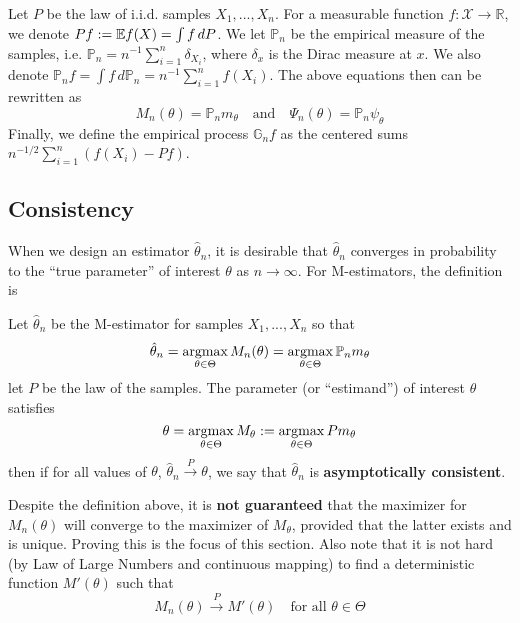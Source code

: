 \documentclass{article}
\begin{document}
Let $P$ be the law of i.i.d. samples $X_1, ..., X_n$. For a measurable function $f: \mathcal{X} \to \mathbb{R}$, we denote $Pf := \mathbb{E} f(X) = \int f\, dP$. We let $\mathbb{P}_n$ be the empirical measure of the samples, i.e. $\mathbb{P}_n = n^{-1} \sum_{i=1}^{n} \delta_{X_i}$, where $\delta_x$ is the Dirac measure at $x$. We also denote $\mathbb{P}_n f = \int f\, d\mathbb{P}_n = n^{-1} \sum_{i=1}^{n} f(X_i)$. The above equations then can be rewritten as 
\begin{equation}
    M_n(\theta) = \mathbb{P}_n m_\theta \quad \text{and} \quad \Psi_n(\theta) = \mathbb{P}_n \psi_\theta
\end{equation}
Finally, we define the empirical process $\mathbb{G}_n f$ as the centered sums $n^{-1/2} \sum_{i=1}^n \left( f(X_i) - Pf \right)$.

\subsection{Consistency}
When we design an estimator $\hat \theta_n$, it is desirable that $\hat \theta_n$ converges in probability to the ``true parameter'' of interest $\theta$ as $n \to \infty$. For M-estimators, the definition is
\begin{definition}
    Let $\hat \theta_n$ be the M-estimator for samples $X_1, ..., X_n$ so that 
    \begin{equation}
        \hat \theta_n = \mathop{\mathrm{argmax}}_{\theta \in \Theta} M_n(\theta) = \mathop{\mathrm{argmax}}_{\theta \in \Theta} \mathbb{P}_n m_\theta
    \end{equation}
    let $P$ be the law of the samples. The parameter (or ``estimand'') of interest $\theta$ satisfies
    \begin{equation}
        \theta = \mathop{\mathrm{argmax}}_{\theta \in \Theta} M_\theta := \mathop{\mathrm{argmax}}_{\theta \in \Theta} P m_\theta
    \end{equation}
    then if for all values of $\theta$, $\hat \theta_n \xrightarrow{P} \theta$, we say that $\hat \theta_n$ is \textbf{asymptotically consistent}.
\end{definition} 
Despite the definition above, it is \textbf{not guaranteed} that the maximizer for $M_n(\theta)$ will converge to the maximizer of $M_\theta$, provided that the latter exists and is unique. Proving this is the focus of this section. Also note that it is not hard (by Law of Large Numbers and continuous mapping) to find a deterministic function $M'(\theta)$ such that
\begin{equation}
    M_n(\theta) \xrightarrow{P} M'(\theta) \quad \text{for all } \theta \in \Theta
\end{equation}
\newpage
\end{document}
